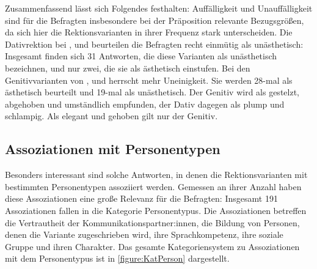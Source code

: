 Zusammenfassend lässt sich Folgendes festhalten: 
Auffälligkeit und Unauffälligkeit sind für die Befragten insbesondere bei der Präposition \gegenueber{} relevante Bezugsgrößen, da sich hier die Rektionsvarianten in ihrer Frequenz stark unterscheiden. 
Die Dativrektion bei \dank, \wegen{} und \waehrend{} beurteilen die Befragten recht einmütig als unästhetisch: Insgesamt finden sich 31 Antworten, die diese Varianten als unästhetisch bezeichnen, und nur zwei, die sie als ästhetisch einstufen. 
Bei den Genitivvarianten von \dank, \wegen{} und \waehrend{} herrscht mehr Uneinigkeit. 
Sie werden 28-mal als ästhetisch beurteilt und 19-mal als unästhetisch. 
Der Genitiv wird als gestelzt, abgehoben und umständlich empfunden, der Dativ dagegen als plump und schlampig. 
Als elegant und gehoben gilt nur der Genitiv. 
\subsection{Assoziationen mit Personentypen}
\label{sec:ErgAssPersonen}
Besonders interessant sind solche Antworten, in denen die Rektionsvarianten mit bestimmten Personentypen assoziiert werden. 
Gemessen an ihrer Anzahl haben diese Assoziationen eine große Relevanz für die Befragten: 
Insgesamt 191 Assoziationen fallen in die Kategorie \glqq Personentypus\grqq. 
Die Assoziationen betreffen die Vertrautheit der Kommunikationspartner:innen, die Bildung von Personen, denen die Variante zugeschrieben wird, ihre Sprachkompetenz, ihre soziale Gruppe und ihren Charakter. 
Das gesamte Kategoriensystem zu Assoziationen mit dem Personentypus ist in \autoref{figure:KatPerson} dargestellt. 

